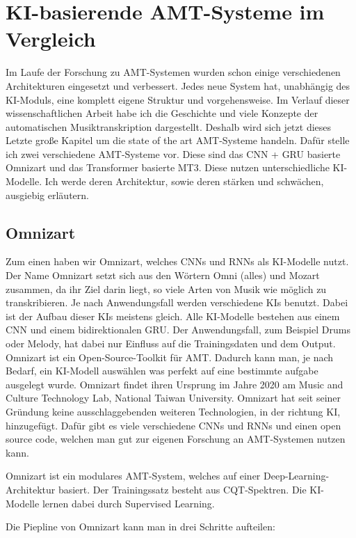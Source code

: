 \section{KI-basierende AMT-Systeme im Vergleich}
Im Laufe der Forschung zu AMT-Systemen wurden schon einige verschiedenen Architekturen eingesetzt und verbessert.
Jedes neue System hat, unabhängig des KI-Moduls, eine komplett eigene Struktur und vorgehensweise.
Im Verlauf dieser wissenschaftlichen Arbeit habe ich die Geschichte
und viele Konzepte der automatischen Musiktranskription dargestellt.
Deshalb wird sich jetzt dieses Letzte große Kapitel um die state of the art AMT-Systeme handeln.
Dafür stelle ich zwei verschiedene AMT-Systeme vor.
Diese sind das CNN + GRU basierte Omnizart und das Transformer basierte MT3.
Diese nutzen unterschiedliche KI-Modelle.
Ich werde deren Architektur, sowie deren stärken und schwächen, ausgiebig erläutern.

\subsection{Omnizart}
Zum einen haben wir Omnizart, welches CNNs und RNNs als KI-Modelle nutzt.
\cite{wu2021omnizart}
Der Name Omnizart setzt sich aus den Wörtern Omni (alles) und Mozart zusammen,
da ihr Ziel darin liegt, so viele Arten von Musik wie möglich zu transkribieren.
Je nach Anwendungsfall werden verschiedene KIs benutzt.
Dabei ist der Aufbau dieser KIs meistens gleich.
Alle KI-Modelle bestehen aus einem CNN und einem bidirektionalen GRU.
Der Anwendungsfall, zum Beispiel Drums oder Melody, hat dabei nur Einfluss auf die Trainingsdaten und dem Output.
Omnizart ist ein Open-Source-Toolkit für AMT.
Dadurch kann man, je nach Bedarf, ein KI-Modell auswählen was perfekt auf eine bestimmte aufgabe ausgelegt wurde.
Omnizart findet ihren Ursprung im Jahre 2020 am Music and Culture Technology Lab, National Taiwan University.
Omnizart hat seit seiner Gründung keine ausschlaggebenden weiteren Technologien, in der richtung KI, hinzugefügt.
Dafür gibt es viele verschiedene CNNs und RNNs und einen open source code,
welchen man gut zur eigenen Forschung an AMT-Systemen nutzen kann.

Omnizart ist ein modulares AMT-System, welches auf einer Deep-Learning-Architektur basiert.
Der Trainingssatz besteht aus CQT-Spektren.
Die KI-Modelle lernen dabei durch Supervised Learning.

Die Piepline von Omnizart kann man in drei Schritte aufteilen:

